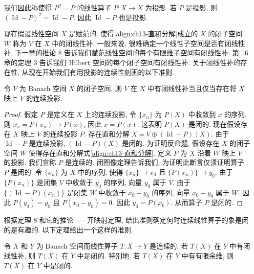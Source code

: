 \documentclass[../../main.tex]{subfiles}
\begin{document}
我们因此称使得 $P^{2}=P$ 的线性算子 $P:X\to X$ 为投影. 若 $P$ 是投影, 则 $(\operatorname{Id}-P)^{2}=\operatorname{Id}-P$. 因此 $\operatorname{Id}-P$ 也是投影.

现在假设线性空间 $X$ 是赋范的. 使得\eqref{align:ch13-直和分解}成立的 $X$ 的闭子空间 $W$ 称为 $V$ 在 $X$ 中的闭线性补. 一般来说, 很难确定一个线性子空间是否有闭线性补. 下一章的推论 8 告诉我们赋范线性空间的每个有限维子空间有闭线性补. 第 16 章的定理 3 告诉我们 Hilbert 空间的每个闭子空间有闭线性补. 关于闭线性补的存在性, 从现在开始我们有用投影的连续性刻画的以下准则.

\begin{theorem}\label{theorem:ch13-闭线性补}
令 $V$ 为 Banach 空间 $X$ 的闭子空间. 则 $V$ 在 $X$ 中有闭线性补当且仅当存在将 $X$ 映上 $V$ 的连续投影.
\end{theorem}

\begin{proof}
假定 $P$ 是定义在 $X$ 上的连续投影, 令 $\{x_{n}\}$ 为 $P(X)$ 中收敛到 $x$ 的序列. 则 $x_{n}=P(x_{n})\to P(x)$, 因此 $x=P(x)$. 这表明 $P(X)$ 是闭的. 现在假设存在 $X$ 映上 $V$ 的连续投影 $P$. 存在直和分解 $X=V\oplus(\operatorname{Id}-P)(X)$. 由于 $\operatorname{Id}-P$ 是连续投影, $(\operatorname{Id}-P)(X)$ 是闭的. 为证明反命题, 假设存在 $X$ 的闭子空间 $W$ 使得存在直和分解式\eqref{align:ch13-直和分解}. 定义 $P$ 为 $X$ 沿着 $W$ 映上 $V$ 的投影. 我们宣称 $P$ 是连续的. 闭图像定理告诉我们, 为证明此断言仅须证明算子 $P$ 是闭的. 令 $\{x_{n}\}$ 为 $X$ 中的序列, 使得 $\{x_{n}\}\to x_{0}$ 且 $\{P(x_{n})\}\to y_{0}$. 由于 $\{P(x_{n})\}$ 是闭集 $V$ 中收敛于 $y_{0}$ 的序列, 向量 $y_{0}$ 属于 $V$. 由于 $\{(\operatorname{Id}-P)(x_{n})\}$ 是闭集 $W$ 中收敛于 $x_{0}-y_{0}$ 的序列, 向量 $x_{0}-y_{0}$ 属于 $W$. 因此 $P(y_{0})=y_{0}$ 且 $P(x_{0}-y_{0})=0$. 因此 $y_{0}=P(x_{0})$. 从而算子 $P$ 是闭的.
\end{proof}

根据定理 8 和它的推论——开映射定理, 给出准则确定何时连续线性算子的象是闭的是有趣的. 以下定理给出一个这样的准则.

\begin{theorem}\label{theorem:ch13-有限余维闭象}
令 $X$ 和 $Y$ 为 Banach 空间而线性算子 $T:X\to Y$ 是连续的. 若 $T(X)$ 在 $Y$ 中有闭线性补, 则 $T(X)$ 在 $Y$ 中是闭的. 特别地, 若 $T(X)$ 在 $Y$ 中有有限余维, 则 $T(X)$ 在 $Y$ 中是闭的.
\end{theorem}
\end{document}

